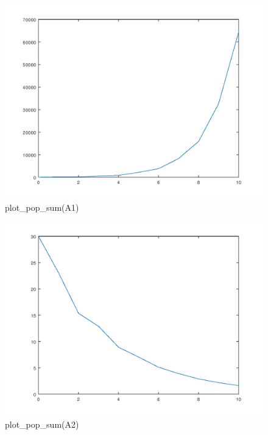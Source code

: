 \documentclass{article}
\begin{document}
\begin{figure}[H]
\centering
\includegraphics[scale=0.6]{plotA1.png}
\caption{plot\_pop\_sum(A1)}
\label{fig:universe}
\end{figure}

\begin{figure}[H]
\centering
\includegraphics[scale=0.5]{plotA2.png}
\caption{plot\_pop\_sum(A2)}
\label{fig:universe}
\end{figure}
\end{document}
